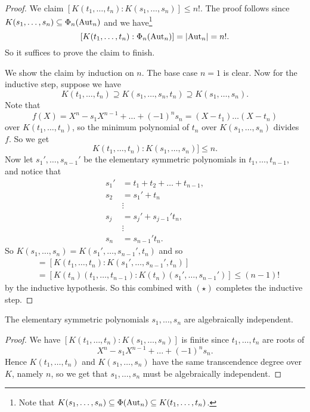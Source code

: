 \begin{proof}
  We claim $[K(t_1, \dots, t_n) : K(s_1, \dots, s_n)] \le n!$.
  The proof follows since
  $K(s_1, \dots, s_n) \subseteq \Phi_n(\operatorname{Aut}_n)$ and we
  have\footnote{Note that $K(s_1, \dots, s_n) \subseteq \Phi(\operatorname{Aut}_n) \subseteq K(t_1, \dots, t_n)$.}
  \[
    [K(t_1, \dots, t_n) : \Phi_n(\operatorname{Aut}_n)]
    = |{\operatorname{Aut}_n}| = n!.
  \]
  So it suffices to prove the claim to finish.
  
  We show the claim by induction on $n$. The base
  case $n = 1$ is clear. Now for the inductive step,
  suppose we have
  \[
    K(t_1, \dots, t_n) \supseteq K(s_1, \dots, s_n, t_n)
    \supseteq K(s_1, \dots, s_n).
  \]
  Note that
  \[
    f(X) = X^n - s_1X^{n - 1} + \dots + (-1)^n s_n
    = (X - t_1)\dots(X - t_n)
  \]
  over $K(t_1, \dots, t_n)$, so the minimum polynomial
  of $t_n$ over $K(s_1, \dots, s_n)$ divides $f$.
  So we get
  \[K(t_1, \dots, t_n) : K(s_1, \dots, s_n)] \le n. \tag{$\star$}\]
  Now let $s_1', \dots, s_{n - 1}'$ be the elementary
  symmetric polynomials in $t_1, \dots, t_{n - 1}$, and
  notice that
  \begin{align*}
    s_1' &= t_1 + t_2 + \dots + t_{n - 1}, \\
    s_2 &= s_1' + t_n \\
    & \vdots \\
    s_{j} &= s_j' + s_{j - 1}' t_n, \\
           & \vdots \\
    s_{n} &= s_{n - 1}' t_n.
  \end{align*}
  So $K(s_1, \dots, s_n) = K(s_1', \dots, s_{n - 1}', t_n)$
  and so
  \begin{align*}
    [K(t_1, \dots, t_n) : K(s_1, \dots, s_n t_n)]
    &= [K(t_1, \dots, t_n) : K(s_1', \dots, s_{n - 1}', t_n)] \\
    &= [K(t_n)(t_1, \dots, t_{n - 1}) : K(t_n)(s_1', \dots, s_{n - 1}')]
    \le (n - 1)!
  \end{align*}
  by the inductive hypothesis. So this combined
  with $(\star)$ completes the inductive step.
\end{proof}

\begin{theorem}
  The elementary symmetric polynomials $s_1, \dots, s_n$
  are algebraically independent.
\end{theorem}

\begin{proof}
  We have $[K(t_1, \dots, t_n) : K(s_1, \dots, s_n)]$ is
  finite since $t_1, \dots, t_n$ are roots of
  \[
    X^n - s_1X^{n - 1} + \dots + (-1)^n s_n.
  \]
  Hence $K(t_1, \dots, t_n)$ and
  $K(s_1, \dots, s_n)$ have the same transcendence
  degree over $K$, namely $n$, so we get that
  $s_1, \dots, s_n$ must be algebraically independent.
\end{proof}

